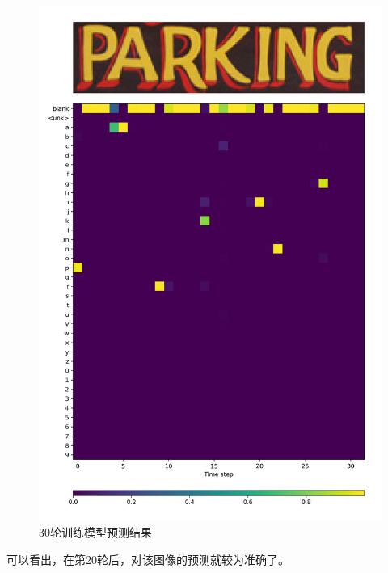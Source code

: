 \documentclass[a4paper]{article}
\begin{document}
\begin{figure}
    \centering
    \includegraphics[width=12cm]{Fig_7.jpg}
    \caption{30轮训练模型预测结果}
\end{figure}
可以看出，在第20轮后，对该图像的预测就较为准确了。\\
\end{document}
